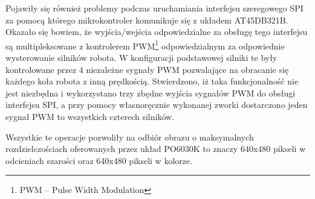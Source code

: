 Pojawiły się również problemy podczas uruchamiania interfejsu szeregowego SPI za pomocą którego mikrokontroler komunikuje się z układem AT45DB321B. Okazało się bowiem, że wyjścia/wejścia odpowiedzialne za obsługę tego interfejsu są multipleksowane z kontrolerem PWM\footnote{PWM -- Pulse Width Modulation} odpowiedzialnym za odpowiednie wysterowanie silników robota. W konfiguracji podstawowej silniki te były kontrolowane przez 4 niezależne sygnały PWM pozwalające na obracanie się każdego koła robota z inną prędkością. Stwierdzono, iż taka funkcjonalność nie jest niezbędna i wykorzystano trzy zbędne wyjścia sygnałów PWM do obsługi interfejsu SPI, a przy pomocy własnoręcznie wykonanej zworki dostarczono jeden sygnał PWM to wszystkich czterech silników.

Wszystkie te operacje pozwoliły na odbiór obrazu o maksymalnych rozdzielczościach oferowanych przez układ PO6030K to znaczy 640x480 pikseli w odcieniach szarości oraz 640x480 pikseli w kolorze.